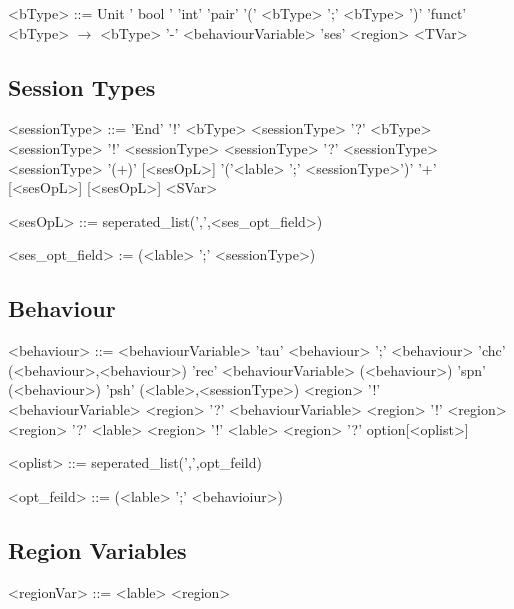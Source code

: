 \documentclass[12pt]{article}
\begin{document}
\begin{grammar}

<bType> ::= Unit
\alt ' bool '
\alt 'int'
\alt 'pair' '(' <bType> ';' <bType> ')'
\alt 'funct' <bType> $\rightarrow$ <bType> '-' <behaviourVariable>
\alt 'ses' <region>
\alt <TVar>

\end{grammar}

\subsection{Session Types}

\begin{grammar}

<sessionType> ::= 'End'
\alt '!' <bType> <sessionType>
\alt '?' <bType> <sessionType>
\alt '!' <sessionType> <sessionType>
\alt '?' <sessionType> <sessionType>
\alt '(+)' [<sesOpL>] '('<lable> ';' <sessionType>')'
\alt '+' [<sesOpL>] [<sesOpL>]
\alt <SVar>

<sesOpL> ::= seperated_list(',',<ses_opt_field>)

<ses_opt_field> := (<lable> ';' <sessionType>)

\end{grammar}

\subsection{Behaviour}

\begin{grammar}

<behaviour> ::= <behaviourVariable>
\alt 'tau'
\alt <behaviour> ';' <behaviour>
\alt 'chc' (<behaviour>,<behaviour>)
\alt 'rec' <behaviourVariable> (<behaviour>)
\alt 'spn' (<behaviour>)
\alt 'psh' (<lable>,<sessionType>)
\alt <region> '!' <behaviourVariable>
\alt <region> '?' <behaviourVariable>
\alt <region> '!' <region>
\alt <region> '?' <lable>
\alt <region> '!' <lable>
\alt <region> '?' option[<oplist>]

<oplist> ::= seperated_list(',',opt_feild)

<opt_feild> ::= (<lable> ';' <behavioiur>)

\end{grammar}

\subsection {Region Variables}

\begin{grammar}

<regionVar> ::= <lable>
\alt <region>

\end{grammar}
\end{document}
